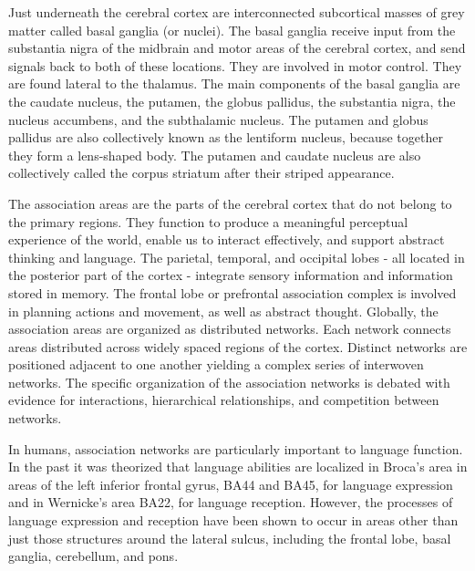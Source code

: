 Just underneath the cerebral cortex are interconnected subcortical masses of grey matter called basal ganglia (or nuclei). The basal ganglia receive input from the substantia nigra of the midbrain and motor areas of the cerebral cortex, and send signals back to both of these locations. They are involved in motor control. They are found lateral to the thalamus. The main components of the basal ganglia are the caudate nucleus, the putamen, the globus pallidus, the substantia nigra, the nucleus accumbens, and the subthalamic nucleus. The putamen and globus pallidus are also collectively known as the lentiform nucleus, because together they form a lens-shaped body. The putamen and caudate nucleus are also collectively called the corpus striatum after their striped appearance.

The association areas are the parts of the cerebral cortex that do not belong to the primary regions. They function to produce a meaningful perceptual experience of the world, enable us to interact effectively, and support abstract thinking and language. The parietal, temporal, and occipital lobes - all located in the posterior part of the cortex - integrate sensory information and information stored in memory. The frontal lobe or prefrontal association complex is involved in planning actions and movement, as well as abstract thought. Globally, the association areas are organized as distributed networks. Each network connects areas distributed across widely spaced regions of the cortex. Distinct networks are positioned adjacent to one another yielding a complex series of interwoven networks. The specific organization of the association networks is debated with evidence for interactions, hierarchical relationships, and competition between networks.

In humans, association networks are particularly important to language function. In the past it was theorized that language abilities are localized in Broca's area in areas of the left inferior frontal gyrus, BA44 and BA45, for language expression and in Wernicke's area BA22, for language reception. However, the processes of language expression and reception have been shown to occur in areas other than just those structures around the lateral sulcus, including the frontal lobe, basal ganglia, cerebellum, and pons.


